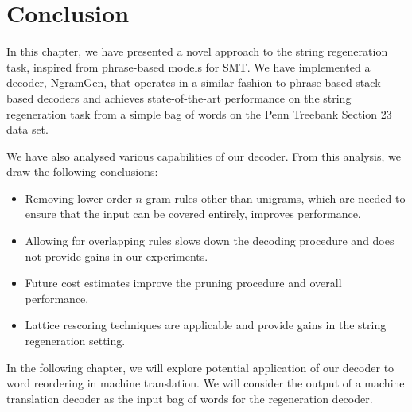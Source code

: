 \section{Conclusion}

In this chapter, we have presented a novel approach to the string regeneration
task, inspired from phrase-based models for SMT.
We have implemented a decoder, NgramGen, that operates in a similar fashion to phrase-based
stack-based decoders and achieves state-of-the-art
performance on the string regeneration task from a simple bag of words on the Penn Treebank
Section 23 data set.

We have also analysed various capabilities of our decoder.
From this analysis, we draw the following conclusions:
%
\begin{itemize}
  \item Removing lower order $n$-gram rules other than unigrams, which are needed to ensure that the input can be covered entirely, improves performance.
  \item Allowing for overlapping rules slows down the decoding procedure and
    does not provide gains in our experiments.
  \item Future cost estimates improve the pruning procedure and overall performance.
  \item Lattice rescoring techniques are applicable and provide gains in the string
    regeneration setting.
\end{itemize}


In the following chapter, we will explore potential application of our decoder
to word reordering in machine translation. We will consider the output of
a machine translation decoder as the input bag of words for the regeneration decoder.


%


